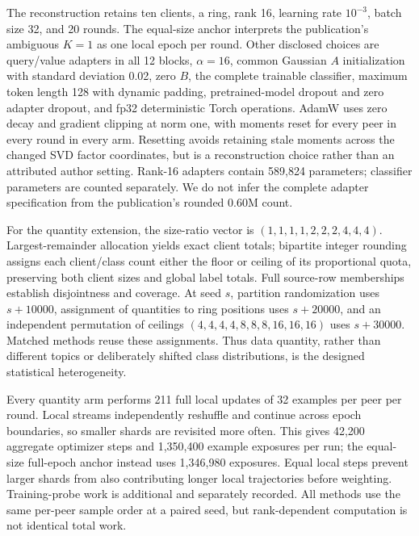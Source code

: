 \documentclass[11pt]{article}
\begin{document}
The reconstruction retains ten clients, a ring, rank 16, learning rate $10^{-3}$, batch size 32, and 20 rounds. The equal-size anchor interprets the publication's ambiguous $K=1$ as one local epoch per round. Other disclosed choices are query/value adapters in all 12 blocks, $\alpha=16$, common Gaussian $A$ initialization with standard deviation 0.02, zero $B$, the complete trainable classifier, maximum token length 128 with dynamic padding, pretrained-model dropout and zero adapter dropout, and fp32 deterministic Torch operations. AdamW uses zero decay and gradient clipping at norm one, with moments reset for every peer in every round in every arm. Resetting avoids retaining stale moments across the changed SVD factor coordinates, but is a reconstruction choice rather than an attributed author setting. Rank-16 adapters contain 589,824 parameters; classifier parameters are counted separately. We do not infer the complete adapter specification from the publication's rounded 0.60M count.

For the quantity extension, the size-ratio vector is $(1,1,1,1,2,2,2,4,4,4)$. Largest-remainder allocation yields exact client totals; bipartite integer rounding assigns each client/class count either the floor or ceiling of its proportional quota, preserving both client sizes and global label totals. Full source-row memberships establish disjointness and coverage. At seed $s$, partition randomization uses $s+10000$, assignment of quantities to ring positions uses $s+20000$, and an independent permutation of ceilings $(4,4,4,4,8,8,8,16,16,16)$ uses $s+30000$. Matched methods reuse these assignments. Thus data quantity, rather than different topics or deliberately shifted class distributions, is the designed statistical heterogeneity.

Every quantity arm performs 211 full local updates of 32 examples per peer per round. Local streams independently reshuffle and continue across epoch boundaries, so smaller shards are revisited more often. This gives 42,200 aggregate optimizer steps and 1,350,400 example exposures per run; the equal-size full-epoch anchor instead uses 1,346,980 exposures. Equal local steps prevent larger shards from also contributing longer local trajectories before weighting. Training-probe work is additional and separately recorded. All methods use the same per-peer sample order at a paired seed, but rank-dependent computation is not identical total work.
\end{document}
